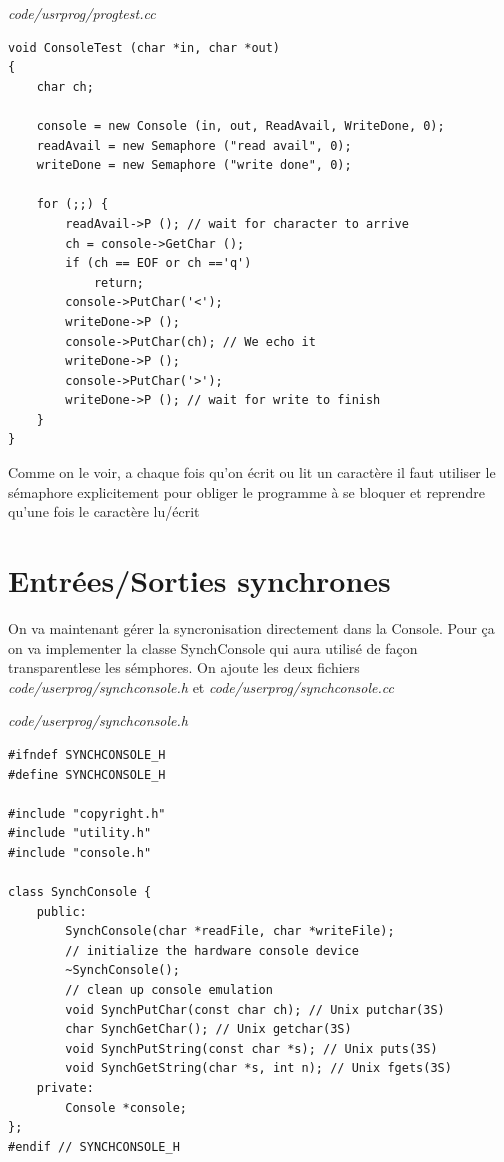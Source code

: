 \documentclass[a4paper,10pt]{article}
\begin{document}
\textit{code/usrprog/progtest.cc}
\begin{lstlisting}
void ConsoleTest (char *in, char *out)
{
    char ch;

    console = new Console (in, out, ReadAvail, WriteDone, 0);
    readAvail = new Semaphore ("read avail", 0);
    writeDone = new Semaphore ("write done", 0);

    for (;;) {
        readAvail->P (); // wait for character to arrive
        ch = console->GetChar ();
        if (ch == EOF or ch =='q')
            return;
        console->PutChar('<');
        writeDone->P ();
        console->PutChar(ch); // We echo it
        writeDone->P ();
        console->PutChar('>');
        writeDone->P (); // wait for write to finish
    }
}
\end{lstlisting}

Comme on le voir, a chaque fois qu'on écrit ou lit un caractère il faut
utiliser le sémaphore explicitement pour obliger le programme à se bloquer et
reprendre qu'une fois le caractère lu/écrit

\section{Entrées/Sorties synchrones}
On va maintenant gérer la syncronisation directement dans la Console. Pour ça
on va implementer la classe SynchConsole qui aura utilisé de façon
transparentlese les sémphores. On ajoute les deux fichiers
\textit{code/userprog/synchconsole.h} et \textit{code/userprog/synchconsole.cc}

\textit{code/userprog/synchconsole.h}
\begin{lstlisting}
#ifndef SYNCHCONSOLE_H
#define SYNCHCONSOLE_H

#include "copyright.h"
#include "utility.h"
#include "console.h"

class SynchConsole {
    public:
        SynchConsole(char *readFile, char *writeFile);
        // initialize the hardware console device
        ~SynchConsole();
        // clean up console emulation
        void SynchPutChar(const char ch); // Unix putchar(3S)
        char SynchGetChar(); // Unix getchar(3S)
        void SynchPutString(const char *s); // Unix puts(3S)
        void SynchGetString(char *s, int n); // Unix fgets(3S)
    private:
        Console *console;
};
#endif // SYNCHCONSOLE_H
\end{lstlisting}
\end{document}
